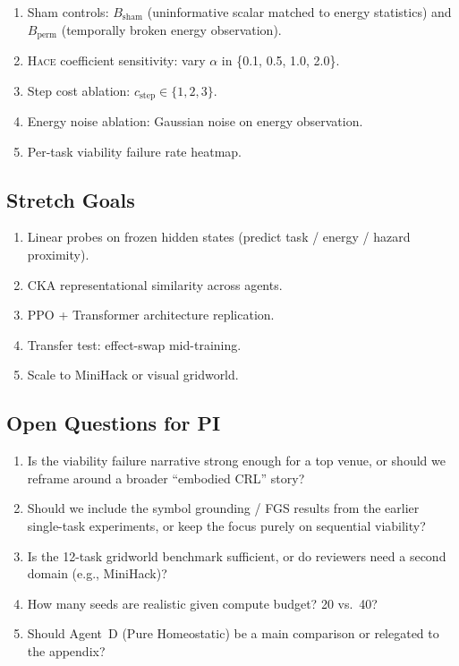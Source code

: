 \documentclass{article}
\newcommand{\hace}{\textsc{Hace}}
\begin{document}
\begin{enumerate}[leftmargin=*]
  \item Sham controls: $B_{\mathrm{sham}}$ (uninformative scalar matched
        to energy statistics) and $B_{\mathrm{perm}}$ (temporally broken
        energy observation).
  \item \hace{} coefficient sensitivity: vary $\alpha$ in
        \{0.1, 0.5, 1.0, 2.0\}.
  \item Step cost ablation: $c_{\mathrm{step}} \in \{1, 2, 3\}$.
  \item Energy noise ablation: Gaussian noise on energy observation.
  \item Per-task viability failure rate heatmap.
\end{enumerate}

\subsection*{Stretch Goals}

\begin{enumerate}[leftmargin=*]
  \item Linear probes on frozen hidden states (predict task / energy /
        hazard proximity).
  \item CKA representational similarity across agents.
  \item PPO + Transformer architecture replication.
  \item Transfer test: effect-swap mid-training.
  \item Scale to MiniHack or visual gridworld.
\end{enumerate}

\subsection*{Open Questions for PI}

\begin{enumerate}[leftmargin=*]
  \item Is the viability failure narrative strong enough for a top venue,
        or should we reframe around a broader ``embodied CRL'' story?
  \item Should we include the symbol grounding / FGS results from the
        earlier single-task experiments, or keep the focus purely on
        sequential viability?
  \item Is the 12-task gridworld benchmark sufficient, or do reviewers
        need a second domain (e.g., MiniHack)?
  \item How many seeds are realistic given compute budget? 20 vs.\ 40?
  \item Should Agent~D (Pure Homeostatic) be a main comparison or
        relegated to the appendix?
\end{enumerate}
\end{document}
